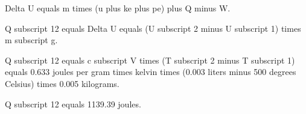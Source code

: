 Delta U equals m times (u plus ke plus pe) plus Q minus W.  

Q subscript 12 equals Delta U equals (U subscript 2 minus U subscript 1) times m subscript g.  

Q subscript 12 equals c subscript V times (T subscript 2 minus T subscript 1) equals 0.633 joules per gram times kelvin times (0.003 liters minus 500 degrees Celsius) times 0.005 kilograms.  

Q subscript 12 equals 1139.39 joules.